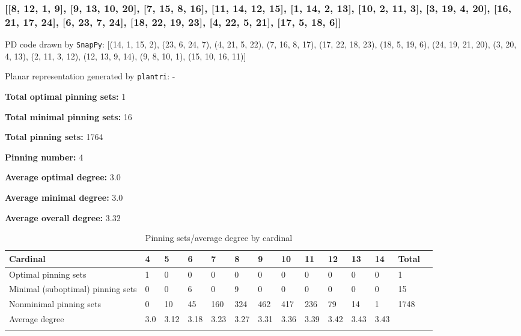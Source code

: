 \documentclass{article}%
\begin{document}
\subsubsection{[[8, 12, 1, 9], [9, 13, 10, 20], [7, 15, 8, 16], [11, 14, 12, 15], [1, 14, 2, 13], [10, 2, 11, 3], [3, 19, 4, 20], [16, 21, 17, 24], [6, 23, 7, 24], [18, 22, 19, 23], [4, 22, 5, 21], [17, 5, 18, 6]]}

{\small\noindent PD code drawn by \texttt{SnapPy}: [(14, 1, 15, 2), (23, 6, 24, 7), (4, 21, 5, 22), (7, 16, 8, 17), (17, 22, 18, 23), (18, 5, 19, 6), (24, 19, 21, 20), (3, 20, 4, 13), (2, 11, 3, 12), (12, 13, 9, 14), (9, 8, 10, 1), (15, 10, 16, 11)]}

{\small\noindent Planar representation generated by \texttt{plantri}: -}

\begin{multicols}{2}
{\normalsize \noindent\textbf{Total optimal pinning sets:} 1

\noindent\textbf{Total minimal pinning sets:} 16

\noindent\textbf{Total pinning sets:} 1764

\noindent\textbf{Pinning number:} 4

}
\columnbreak

{\normalsize \noindent\textbf{Average optimal degree:} 3.0

\noindent\textbf{Average minimal degree:} 3.0

\noindent\textbf{Average overall degree:} 3.32

}
\end{multicols}

\begin{table}[ht]
	\caption{Pinning sets/average degree by cardinal}
	\centering
	\renewcommand{\arraystretch}{1.5}
	\begin{tabularx}{\textwidth}{lXXXXXXXXXXXXX}
		\toprule
			Cardinal & 4 & 5 & 6 & 7 & 8 & 9 & 10 & 11 & 12 & 13 & 14 & Total\\
			\hline
			Optimal pinning sets & 1 & 0 & 0 & 0 & 0 & 0 & 0 & 0 & 0 & 0 & 0 & 1 \\
			Minimal (suboptimal) pinning sets & 0 & 0 & 6 & 0 & 9 & 0 & 0 & 0 & 0 & 0 & 0 & 15 \\
			Nonminimal pinning sets & 0 & 10 & 45 & 160 & 324 & 462 & 417 & 236 & 79 & 14 & 1 & 1748 \\
			Average degree & 3.0 & 3.12 & 3.18 & 3.23 & 3.27 & 3.31 & 3.36 & 3.39 & 3.42 & 3.43 & 3.43 &  \\
		\bottomrule \\ 
	\end{tabularx}
\end{table}
\end{document}
